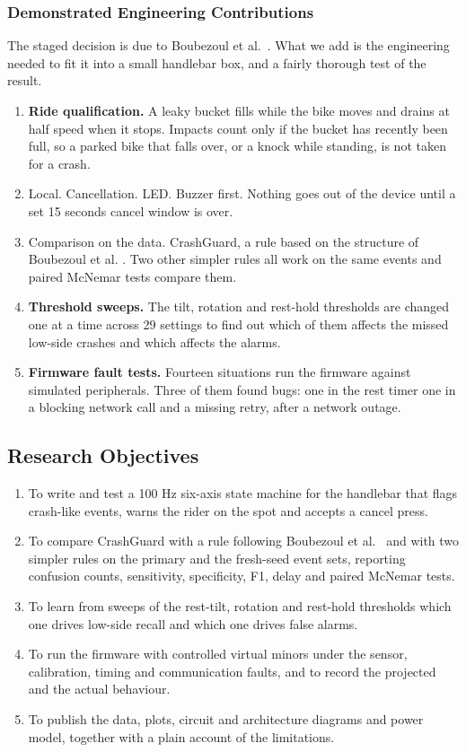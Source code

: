 \documentclass[10pt,a4paper]{article}
\begin{document}
\subsubsection*{Demonstrated Engineering Contributions}
The staged decision is due to Boubezoul et al.~\cite{boubezoul2013algorithm}. What we add is the engineering needed to fit it into a small handlebar box, and a fairly thorough test of the result.
\begin{enumerate}[label=\textbf{\arabic*.}]
\item \textbf{Ride qualification.} A leaky bucket fills while the bike moves and drains at half speed when it stops. Impacts count only if the bucket has recently been full, so a parked bike that falls over, or a knock while standing, is not taken for a crash.
\item Local. Cancellation. LED. Buzzer first. Nothing goes out of the device until a set 15 seconds cancel window is over.
\item Comparison on the data. CrashGuard, a rule based on the structure of Boubezoul et al. \cite{boubezoul2013algorithm}. Two other simpler rules all work on the same events and paired McNemar tests compare them.
\item \textbf{Threshold sweeps.} The tilt, rotation and rest-hold thresholds are changed one at a time across 29 settings to find out which of them affects the missed low-side crashes and which affects the alarms.
\item \textbf{Firmware fault tests.} Fourteen situations run the firmware against simulated peripherals. Three of them found bugs: one in the rest timer one in a blocking network call and a missing retry, after a network outage.
\end{enumerate}

\subsection{Research Objectives}
\begin{enumerate}
\item To write and test a 100 Hz six-axis state machine for the handlebar that flags crash-like events, warns the rider on the spot and accepts a cancel press.
\item To compare CrashGuard with a rule following Boubezoul et al.~\cite{boubezoul2013algorithm} and with two simpler rules on the primary and the fresh-seed event sets, reporting confusion counts, sensitivity, specificity, F1, delay and paired McNemar tests.
\item To learn from sweeps of the rest-tilt, rotation and rest-hold thresholds which one drives low-side recall and which one drives false alarms.
\item To run the firmware with controlled virtual minors under the sensor, calibration, timing and communication faults, and to record the projected and the actual behaviour.
\item To publish the data, plots, circuit and architecture diagrams and power model, together with a plain account of the limitations.
\end{enumerate}
\end{document}

